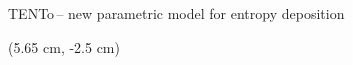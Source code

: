 \documentclass[svgnames]{beamer}
\newcommand{\trento}{T\raisebox{-.5ex}{R}ENTo}
\begin{document}
\begin{frame}{\trento \,-- new parametric model for entropy deposition}
   \begin{textblock*}{0.5\linewidth}(5.65 cm, -2.5 cm)

\end{textblock*}
\end{frame}
\end{document}
